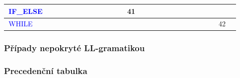\documentclass[a4paper]{article}
\theoremstyle{definition}
\newcommand{\nter}[1]{\textcolor{blue}{\,#1\,}}
\begin{document}
\begin{center}
{\begin{tabular}{| l || c | c | c | c | c | c | c | c | c | c | c | c | c | c | c | c | c | c | c | c | c | c | c | c | c |}
	\nter{IF\_ELSE}    &         &         &         &         &         &          &            &           &                &              &          &   41     &               &                &                   &                   &             &           &              &               &              &              &            &             & \\\hline
	\nter{WHILE}       &         &         &         &         &         &          &            &           &                &              &          &          &               &                &                   &                   &             &           &              &               &              &              &            &    42       & \\

\end{tabular}
}
\end{center}

\subsubsection{Případy nepokryté LL-gramatikou} %

\subsubsection{Precedenční tabulka}
\end{document}
